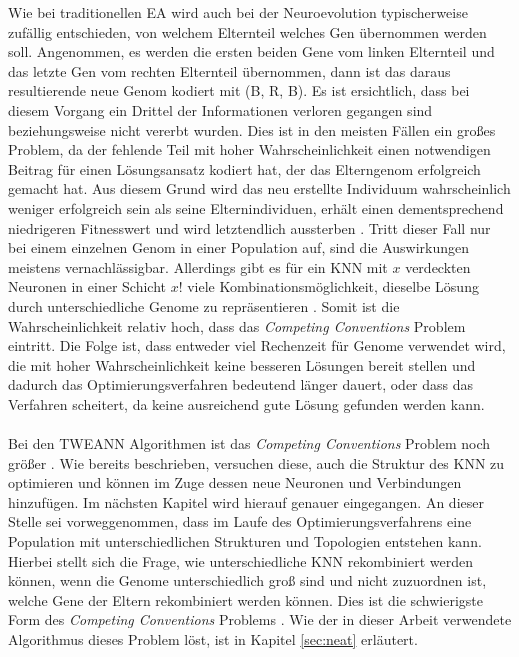 Wie bei traditionellen \ac{EA} wird auch bei der Neuroevolution typischerweise zufällig entschieden, von welchem Elternteil welches Gen übernommen werden soll. Angenommen, es werden die ersten beiden Gene vom linken Elternteil und das letzte Gen vom rechten Elternteil übernommen, dann ist das daraus resultierende neue Genom kodiert mit (B, R, B). Es ist ersichtlich, dass bei diesem Vorgang ein Drittel der Informationen verloren gegangen sind beziehungsweise nicht vererbt wurden. Dies ist in den meisten Fällen ein großes Problem, da der fehlende Teil mit hoher Wahrscheinlichkeit einen notwendigen Beitrag für einen Lösungsansatz kodiert hat, der das Elterngenom erfolgreich gemacht hat. Aus diesem Grund wird das neu erstellte Individuum wahrscheinlich weniger erfolgreich sein als seine Elternindividuen, erhält einen dementsprechend niedrigeren Fitnesswert und wird letztendlich aussterben \cite{stanley2002evolving}. Tritt dieser Fall nur bei einem einzelnen Genom in einer Population auf, sind die Auswirkungen meistens vernachlässigbar. Allerdings gibt es für ein \ac{KNN} mit $x$ verdeckten Neuronen in einer Schicht $x!$ viele Kombinationsmöglichkeit, dieselbe Lösung durch unterschiedliche Genome zu repräsentieren \cite{stanley2002evolving}. Somit ist die Wahrscheinlichkeit relativ hoch, dass das \emph{Competing Conventions} Problem eintritt. Die Folge ist, dass entweder viel Rechenzeit für Genome verwendet wird, die mit hoher Wahrscheinlichkeit keine besseren Lösungen bereit stellen und dadurch das Optimierungsverfahren bedeutend länger dauert, oder dass das Verfahren scheitert, da keine ausreichend gute Lösung gefunden werden kann. 
\\\\
Bei den \ac{TWEANN} Algorithmen ist das \emph{Competing Conventions} Problem noch größer \cite{stanley2002evolving}. Wie bereits beschrieben, versuchen diese, auch die Struktur des \ac{KNN} zu optimieren und können im Zuge dessen neue Neuronen und Verbindungen hinzufügen. Im nächsten Kapitel wird hierauf genauer eingegangen. An dieser Stelle sei vorweggenommen, dass im Laufe des Optimierungsverfahrens eine Population mit unterschiedlichen Strukturen und Topologien entstehen kann. Hierbei stellt sich die Frage, wie unterschiedliche \ac{KNN} rekombiniert werden können, wenn die Genome unterschiedlich groß sind und nicht zuzuordnen ist, welche Gene der Eltern rekombiniert werden können. Dies ist die schwierigste Form des \emph{Competing Conventions} Problems \cite{stanley2002evolving}. Wie der in dieser Arbeit verwendete Algorithmus dieses Problem löst, ist in Kapitel \ref{sec:neat} erläutert.

